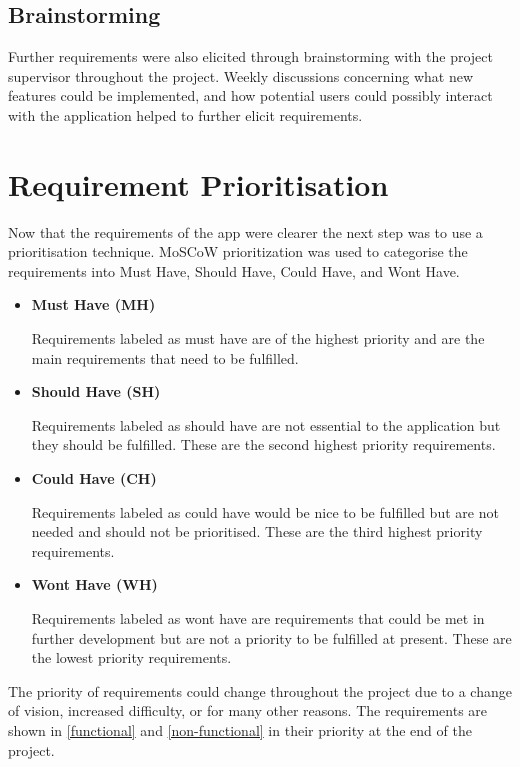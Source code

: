 \subsection{Brainstorming}
Further requirements were also elicited through brainstorming with the project supervisor throughout the project. Weekly discussions concerning what new features could be implemented, and how potential users could possibly interact with the application helped to further elicit requirements.
\section{Requirement Prioritisation}
Now that the requirements of the app were clearer the next step was to use a prioritisation technique. MoSCoW prioritization \citep{moscow} was used to categorise the requirements into Must Have, Should Have, Could Have, and Wont Have.
\begin{itemize}
    \item \textbf{Must Have (MH)} \par
    Requirements labeled as must have are of the highest priority and are the main requirements that need to be fulfilled. 
    \item \textbf{Should Have (SH)} \par
    Requirements labeled as should have are not essential to the application but they should be fulfilled. These are the second highest priority requirements. 
    \item \textbf{Could Have (CH)} \par
    Requirements labeled as could have would be nice to be fulfilled but are not needed and should not be prioritised. These are the third highest priority requirements. 
    \item \textbf{Wont Have (WH)} \par
    Requirements labeled as wont have are requirements that could be met in further development but are not a priority to be fulfilled at present. These are the lowest priority requirements. 
\end{itemize}
The priority of requirements could change throughout the project due to a change of vision, increased difficulty, or for many other reasons. The requirements are shown in \ref{functional} and \ref{non-functional} in their priority at the end of the project.
